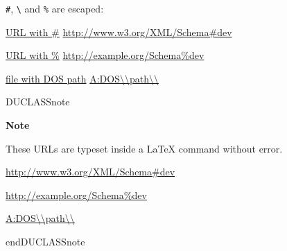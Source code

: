 \documentclass[a4paper]{article}
\newenvironment{DUclass}[1]%
  {%
   \def\DocutilsClassFunctionName{DUCLASS#1}
     \csname \DocutilsClassFunctionName \endcsname}%
  {\csname end\DocutilsClassFunctionName \endcsname}%
\newenvironment{DUadmonition}%
  {\begin{center}
     \begin{lrbox}{\DUadmonitionbox}
       \begin{minipage}{0.9\linewidth}
  }%
  {    \end{minipage}
     \end{lrbox}
     \fbox{\usebox{\DUadmonitionbox}}
   \end{center}
  }
\newenvironment{DUlineblock}[1]{%
    \list{}{\setlength{\partopsep}{\parskip}
            \addtolength{\partopsep}{\baselineskip}
            \setlength{\topsep}{0pt}
            \setlength{\itemsep}{0.15\baselineskip}
            \setlength{\parsep}{0pt}
            \setlength{\leftmargin}{#1}}
    \raggedright
  }
  {\endlist}
\providecommand*{\DUtitle}[1]{%
  \smallskip\noindent\textbf{#1}\smallskip}
\begin{document}
\begin{itemize}
\item \texttt{\#}, \texttt{\textbackslash{}} and \texttt{\%} are escaped:

\begin{DUlineblock}{0em}
\item[] \href{http://www.w3.org/XML/Schema\#dev}{URL with \#}
\url{http://www.w3.org/XML/Schema\#dev}
\item[] \href{http://www.w3.org/XML/Schema\%dev}{URL with \%}
\url{http://example.org/Schema\%dev}
\item[] \href{A:DOS\\path\\}{file with DOS path} \url{A:DOS\\path\\}
\end{DUlineblock}

\begin{DUclass}{note}
\begin{DUadmonition}
\DUtitle{Note}

These URLs are typeset inside a LaTeX command without error.

\begin{DUlineblock}{0em}
\item[] \url{http://www.w3.org/XML/Schema\#dev}
\item[] \url{http://example.org/Schema\%dev}
\item[] \url{A:DOS\\path\\}
\end{DUlineblock}
\end{DUadmonition}
\end{DUclass}
\end{itemize}
\end{document}
